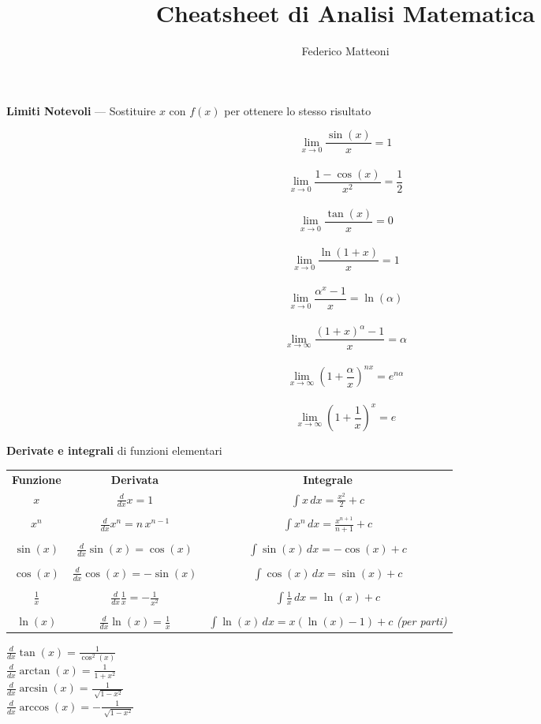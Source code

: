 \documentclass[10pt]{article}
\begin{document}
\title{Cheatsheet di Analisi Matematica}
\author{Federico Matteoni}
\date{ }
\renewcommand*\contentsname{Indice}

\maketitle
\textbf{Limiti Notevoli} --- Sostituire $x$ con $f(x)$ per ottenere lo stesso risultato
\begin{multicols}{4}
$$\lim_{x\to0} \frac{\sin(x)}{x} = 1$$\\
$$\lim_{x\to0} \frac{1 - \cos(x)}{x^2} = \frac{1}{2}$$\\
$$\lim_{x\to0} \frac{\tan(x)}{x} = 0$$\\
$$\lim_{x\to0} \frac{\ln(1 + x)}{x} = 1$$\\
$$\lim_{x\to0} \frac{\alpha^x - 1}{x} = \ln(\alpha)$$\\
$$\lim_{x\to\infty} \frac{(1 + x)^\alpha - 1}{x} = \alpha$$\\
$$\lim_{x\to\infty} (1 + \frac{\alpha}{x})^{nx} = e^{n\alpha}$$\\
$$\lim_{x\to\infty} (1 + \frac{1}{x})^{x} = e$$
\end{multicols}
\textbf{Derivate e integrali} di funzioni elementari
\begin{center}
	\begin{tabular}{c | c c}
		\textbf{Funzione} & \textbf{Derivata} & \textbf{Integrale} \\
		$x$ & $\frac{d}{dx} x = 1$ & $\int x\,dx = \frac{x^2}{2} + c$ \\
		\\
		$x^n$ & $\frac{d}{dx} x^n = n\,x^{n-1}$ & $\int x^n\,dx = \frac{x^{n+1}}{n+1} + c$ \\
		\\
		$\sin(x)$ & $\frac{d}{dx} \sin(x) = \cos(x)$ & $\int \sin(x)\,dx = -\cos(x) + c$ \\
		\\
		$\cos(x)$ & $\frac{d}{dx} \cos(x) = -\sin(x)$ & $\int \cos(x)\,dx = \sin(x) + c$ \\
		\\
		$\frac{1}{x}$ & $\frac{d}{dx} \frac{1}{x} = -\frac{1}{x^2}$ & $\int \frac{1}{x}\,dx = \ln(x) + c$ \\
		\\
		$\ln(x)$ & $\frac{d}{dx} \ln(x) = \frac{1}{x}$ & $\int \ln(x)\,dx = x(\ln(x) - 1) + c$ \textit{(per parti)} \\
	\end{tabular}
	\begin{multicols}{4}
		$\frac{d}{dx} \tan(x) = \frac{1}{\cos^2(x)}$ \\
		$\frac{d}{dx} \arctan(x) = \frac{1}{1 + x^2}$ \\
		$\frac{d}{dx} \arcsin(x) = \frac{1}{\sqrt[]{1 - x^2}}$\\
		$\frac{d}{dx} \arccos(x) = -\frac{1}{\sqrt[]{1 - x^2}}$\\
	\end{multicols}
\end{center}
\end{document}
